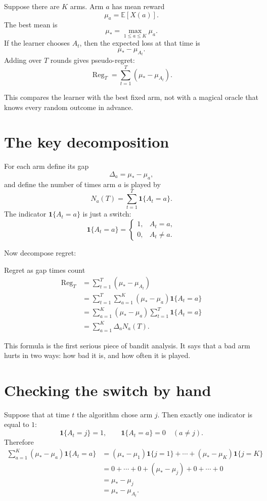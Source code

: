 \documentclass[en,nofont,11pt]{elegantbook}
\newcommand{\E}{\mathbb{E}}
\newcommand{\ind}{\mathbf{1}}
\providecommand{\Reg}{\operatorname{Reg}}
\begin{document}
Suppose there are $K$ arms. Arm $a$ has mean reward
\[
\mu_a=\E[X(a)].
\]
The best mean is
\[
\mu_* = \max_{1\leq a\leq K}\mu_a.
\]
If the learner chooses $A_t$, then the expected loss at that time is
\[
\mu_* - \mu_{A_t}.
\]
Adding over $T$ rounds gives pseudo-regret:
\[
\Reg_T=\sum_{t=1}^T(\mu_* - \mu_{A_t}).
\]

This compares the learner with the best fixed arm, not with a magical oracle that knows every random outcome in advance.

\section{The key decomposition}

For each arm define its gap
\[
\Delta_a=\mu_* - \mu_a,
\]
and define the number of times arm $a$ is played by
\[
N_a(T)=\sum_{t=1}^T \ind\{A_t=a\}.
\]
The indicator $\ind\{A_t=a\}$ is just a switch:
\[
\ind\{A_t=a\}=\begin{cases}
1,& A_t=a,\\
0,& A_t\neq a.
\end{cases}
\]

Now decompose regret:

\begin{derivationbox}{Regret as gap times count}
\[
\begin{aligned}
\Reg_T
&=\sum_{t=1}^T(\mu_* - \mu_{A_t})\\
&=\sum_{t=1}^T\sum_{a=1}^K(\mu_* - \mu_a)\ind\{A_t=a\}\\
&=\sum_{a=1}^K(\mu_* - \mu_a)\sum_{t=1}^T\ind\{A_t=a\}\\
&=\sum_{a=1}^K\Delta_a N_a(T).
\end{aligned}
\]
\end{derivationbox}

This formula is the first serious piece of bandit analysis. It says that a bad arm hurts in two ways: how bad it is, and how often it is played.

\section{Checking the switch by hand}

Suppose that at time $t$ the algorithm chose arm $j$. Then exactly one indicator is equal to $1$:
\[
\ind\{A_t=j\}=1,
\qquad
\ind\{A_t=a\}=0\quad(a\neq j).
\]
Therefore
\[
\begin{aligned}
\sum_{a=1}^K(\mu_* - \mu_a)\ind\{A_t=a\}
&=(\mu_* - \mu_1)\ind\{j=1\}+\cdots+(\mu_* - \mu_K)\ind\{j=K\}\\
&=0+\cdots+0+(\mu_* - \mu_j)+0+\cdots+0\\
&=\mu_* - \mu_j\\
&=\mu_* - \mu_{A_t}.
\end{aligned}
\]
\end{document}
